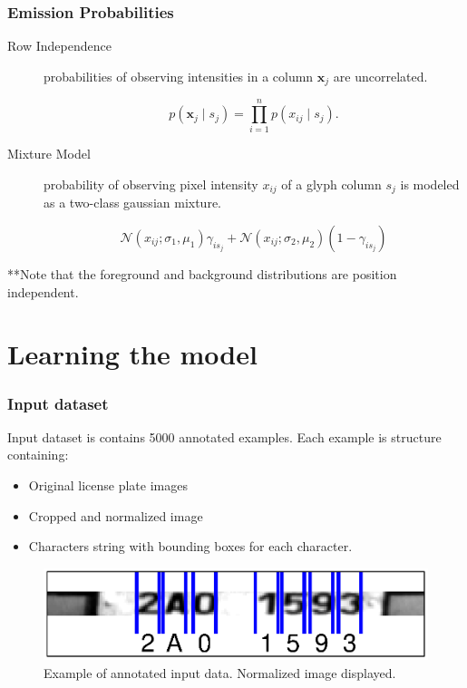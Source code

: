 \documentclass{beamer}
\begin{document}
\begin{frame}
  \frametitle{Emission Probabilities}

\begin{description}
\item[Row Independence] probabilities of observing intensities in
  a column $\mathbf{x}_j$ are uncorrelated.

  \[p(\mathbf{x}_j \mid s_j) = \prod_{i=1}^np(x_{ij} \mid s_j).\] 

\item[Mixture Model] probability of observing pixel intensity $x_{ij}$
  of a glyph column $s_j$ is modeled as a two-class gaussian mixture.

\[
\mathcal{N}(x_{ij};\sigma_1,\mu_1)\gamma_{is_j}+\mathcal{N}(x_{ij};\sigma_2,\mu_2)(1-\gamma_{is_j})
\]
\end{description} 

**Note that the foreground and background distributions are position
independent.
\end{frame}

\section{Learning the model}

\begin{frame}
  \frametitle{Input dataset}
  Input dataset is contains 5000 annotated examples. Each example is structure containing:
\begin{itemize}
  \item Original license plate images
  \item Cropped and normalized image
  \item Characters string with bounding boxes for each character.
\end{itemize}

\begin{figure}
\includegraphics[width=\linewidth]{pics/input_example.eps}
\caption{Example of annotated input data. Normalized image displayed.}
\label{fig:distribution}
\end{figure}

\end{frame}
\end{document}
